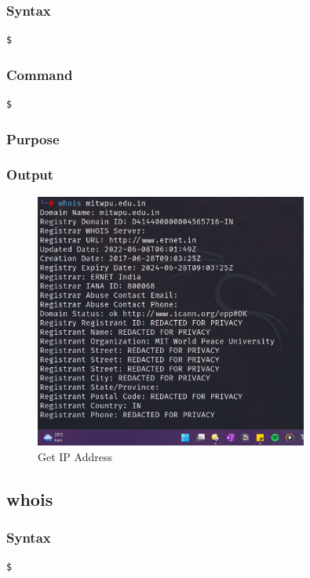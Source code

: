 \documentclass[11pt]{article}
\begin{document}
\subsubsection*{Syntax}
\begin{verbatim}
$
\end{verbatim}

\subsubsection*{Command}
\begin{verbatim}
$
\end{verbatim}

\subsubsection*{Purpose}

\subsubsection*{Output}
\begin{figure}[H]
    \centering
    \includegraphics[width=0.8\textwidth]{whois.png}
    \caption{Get IP Address}
    \label{fig:1}
\end{figure}
\subsection{whois}

\subsubsection*{Syntax}
\begin{verbatim}
$
\end{verbatim}
\end{document}
